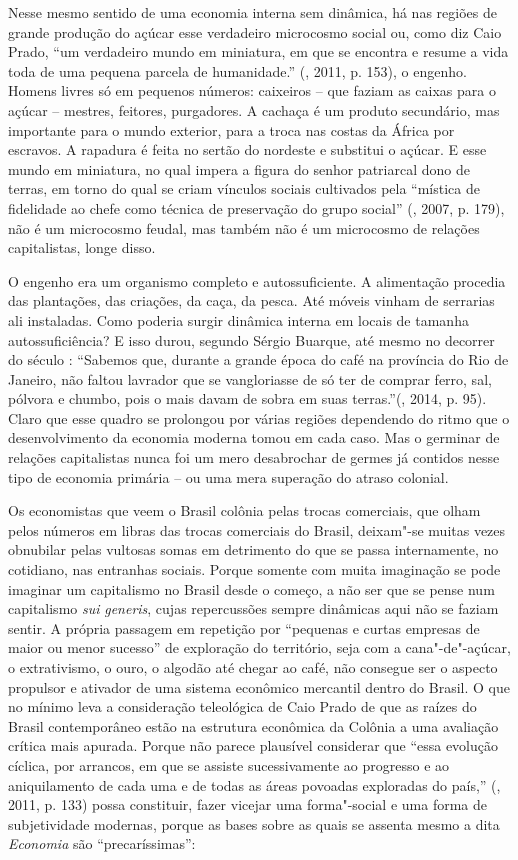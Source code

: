 {Nesse mesmo sentido de uma economia interna sem dinâmica, há nas regiões
de grande produção do açúcar esse verdadeiro microcosmo social ou, como
diz Caio Prado, ``um verdadeiro mundo em miniatura, em que se encontra e
resume a vida toda de uma pequena parcela de humanidade.'' (,
2011, p. 153), o engenho. Homens livres só em pequenos números:
caixeiros -- que faziam as caixas para o açúcar -- mestres, feitores,
purgadores. A cachaça é um produto secundário, mas importante para o
mundo exterior, para a troca nas costas da África por escravos. A
rapadura é feita no sertão do nordeste e substitui o açúcar. E esse
mundo em miniatura, no qual impera a figura do senhor patriarcal dono de
terras, em torno do qual se criam vínculos sociais cultivados pela
``mística de fidelidade ao chefe como técnica de preservação do grupo
social'' (, 2007, p. 179), não é um microcosmo feudal, mas também
não é um microcosmo de relações capitalistas, longe disso.

O engenho era um organismo completo e autossuficiente. A alimentação
procedia das plantações, das criações, da caça, da pesca. Até móveis
vinham de serrarias ali instaladas. Como poderia surgir dinâmica interna
em locais de tamanha autossuficiência? E isso durou, segundo Sérgio
Buarque, até mesmo no decorrer do século : ``Sabemos que, durante a
grande época do café na província do Rio de Janeiro, não faltou lavrador
que se vangloriasse de só ter de comprar ferro, sal, pólvora e chumbo,
pois o mais davam de sobra em suas terras.''(, 2014, p. 95).
Claro que esse quadro se prolongou por várias regiões dependendo do
ritmo que o desenvolvimento da economia moderna tomou em cada caso. Mas
o germinar de relações capitalistas nunca foi um mero desabrochar de
germes já contidos nesse tipo de economia primária -- ou uma mera
superação do atraso colonial.

Os economistas que veem o Brasil colônia pelas trocas comerciais, que
olham pelos números em libras das trocas comerciais do Brasil, deixam"-se
muitas vezes obnubilar pelas vultosas somas em detrimento do que se
passa internamente, no cotidiano, nas entranhas sociais. Porque somente
com muita imaginação se pode imaginar um capitalismo no Brasil desde o
começo, a não ser que se pense num capitalismo \emph{sui}
\emph{generis}, cujas repercussões sempre dinâmicas aqui não se faziam
sentir. A própria passagem em repetição por ``pequenas e curtas empresas
de maior ou menor sucesso'' de exploração do território, seja com a
cana"-de"-açúcar, o extrativismo, o ouro, o algodão até chegar ao café,
não consegue ser o aspecto propulsor e ativador de uma sistema econômico
mercantil dentro do Brasil. O que no mínimo leva a consideração
teleológica de Caio Prado de que as raízes do Brasil contemporâneo estão
na estrutura econômica da Colônia a uma avaliação crítica mais apurada.
Porque não parece plausível considerar que ``essa evolução cíclica, por
arrancos, em que se assiste sucessivamente ao progresso e ao
aniquilamento de cada uma e de todas as áreas povoadas exploradas do
país,'' (, 2011, p. 133) possa constituir, fazer vicejar uma
forma"-social e uma forma de subjetividade modernas, porque as bases
sobre as quais se assenta mesmo a dita \emph{Economia} são
``precaríssimas'':

}
